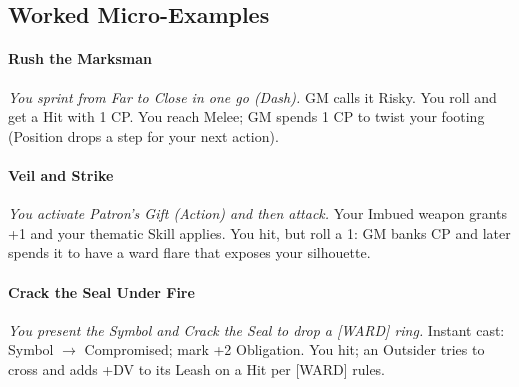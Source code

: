 \subsection{Worked Micro-Examples}
\paragraph{Rush the Marksman}
\emph{You sprint from Far to Close in one go (Dash).} GM calls it Risky. You roll and get a Hit with 1 CP. You reach Melee; GM spends 1 CP to twist your footing (Position drops a step for your next action).

\paragraph{Veil and Strike}
\emph{You activate Patron’s Gift (Action) and then attack.} Your Imbued weapon grants +1 and your thematic Skill applies. You hit, but roll a 1: GM banks CP and later spends it to have a ward flare that exposes your silhouette.

\paragraph{Crack the Seal Under Fire}
\emph{You present the Symbol and Crack the Seal to drop a [WARD] ring.} Instant cast: Symbol $\rightarrow$ Compromised; mark +2 Obligation. You hit; an Outsider tries to cross and adds +DV to its Leash on a Hit per [WARD] rules.
